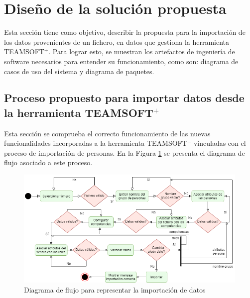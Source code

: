 \begin{table}[H]
	\centering
	\caption{Transformación de los años de experiencia a la preferencia de los profesores por los roles}\label{trans-prof}
\end{table}

\section{Diseño de la solución propuesta} \label{sec:diseno-solucion}

Esta sección tiene como objetivo, describir la propuesta para la importación de los datos provenientes de un fichero, en datos que gestiona la herramienta TEAMSOFT$^+$. Para lograr esto, se muestran los artefactos de ingeniería de software necesarios para entender su funcionamiento, como son: diagrama de casos de uso del sistema y diagrama de paquetes.


\subsection{Proceso propuesto para importar datos desde la herramienta TEAMSOFT$^+$}
Esta sección se comprueba el correcto funcionamiento de las nuevas funcionalidades incorporadas a la herramienta TEAMSOFT$^+$ vinculadas con el proceso de importación de personas. En la Figura \ref{fig:diagrama-flujo-importar} se presenta el diagrama de flujo asociado a este proceso. 

\begin{figure}[H]
	\centering
	\includegraphics[width=.85\textwidth]{figuras/diagramas-teamsoft-Flujo-Importar.png}
	\caption{Diagrama de flujo para representar la importación de datos	} \label{fig:diagrama-flujo-importar}
\end{figure}

